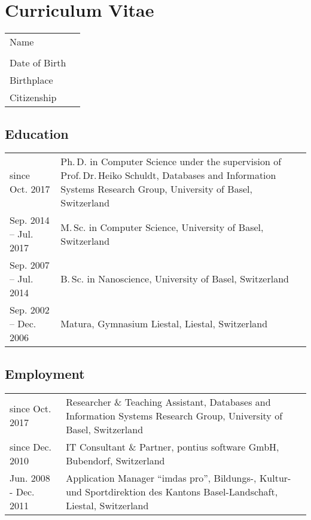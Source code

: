 
\chapter*{Curriculum Vitae}


\begin{tabularx}{\textwidth}{>{\raggedleft}p{}X}
	Name  & \thesisauthor \\
	& \thesisauthoraddress \\
	Date of Birth & \thesisauthordateofbirth \\
	Birthplace & \thesisauthorbirthplace \\
	Citizenship & \thesisauthornationalityCv \\
\end{tabularx}

\section*{Education}
\begin{tabularx}{\textwidth}{>{\raggedleft}p{}X}
	since Oct. 2017  & Ph.\,D. in Computer Science under the supervision of Prof.\,Dr.\,Heiko Schuldt, Databases and Information Systems Research Group, University of Basel, Switzerland \\
	\rule{0pt}{3ex}%
	Sep. 2014 -- Jul. 2017  & M.\,Sc. in Computer Science, University of Basel, Switzerland \\
	\rule{0pt}{3ex}%
	Sep. 2007 -- Jul. 2014  & B.\,Sc. in Nanoscience, University of Basel, Switzerland \\
	\rule{0pt}{3ex}%
	Sep. 2002 -- Dec. 2006  & Matura, Gymnasium Liestal, Liestal, Switzerland \\
\end{tabularx}

\section*{Employment}
\begin{tabularx}{\textwidth}{>{\raggedleft}p{}X}
	since Oct. 2017  & Researcher \& Teaching Assistant, Databases and Information Systems Research Group, University of Basel, Switzerland \\
	since Dec. 2010  & IT Consultant \& Partner, pontius software GmbH, Bubendorf, Switzerland \\
	Jun. 2008 - Dec. 2011  & Application Manager ``imdas pro'', Bildungs-, Kultur- und Sportdirektion des Kantons Basel-Landschaft, Liestal, Switzerland
\end{tabularx}

